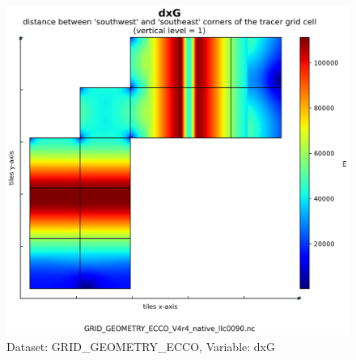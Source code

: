 \begin{figure}[H]
\centering
\includegraphics[scale=0.55]{../images/plots/native_plots_coords/Geometry_Parameters_for_the_Lat-Lon-Cap_90_(llc90)_Native_Model_Grid_(Version_4_Release_4)/dxG.png}
\caption{Dataset: GRID\_GEOMETRY\_ECCO, Variable: dxG}
\label{tab:table-GRID_GEOMETRY_ECCO_dxG-Plot}
\end{figure}
\newpage
\pagebreak
